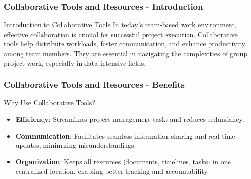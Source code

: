 \documentclass[aspectratio=169]{beamer}
\begin{document}
\begin{frame}[fragile]
    \frametitle{Collaborative Tools and Resources - Introduction}
    \begin{block}{Introduction to Collaborative Tools}
    In today’s team-based work environment, effective collaboration is crucial for successful project execution. Collaborative tools help distribute workloads, foster communication, and enhance productivity among team members. They are essential in navigating the complexities of group project work, especially in data-intensive fields.
    \end{block}
\end{frame}

\begin{frame}[fragile]
    \frametitle{Collaborative Tools and Resources - Benefits}
    \begin{block}{Why Use Collaborative Tools?}
        \begin{itemize}
            \item \textbf{Efficiency}: Streamlines project management tasks and reduces redundancy.
            \item \textbf{Communication}: Facilitates seamless information sharing and real-time updates, minimizing misunderstandings.
            \item \textbf{Organization}: Keeps all resources (documents, timelines, tasks) in one centralized location, enabling better tracking and accountability.
        \end{itemize}
    \end{block}
\end{frame}
\end{document}
